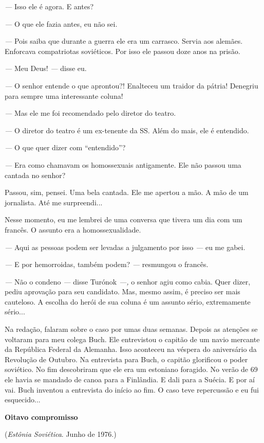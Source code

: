 \emph{---} Isso ele é agora. E antes?

\emph{---} O que ele fazia antes, eu não sei.

\emph{---} Pois saiba que durante a guerra ele era um carrasco. Servia
aos alemães. Enforcava compatriotas soviéticos. Por isso ele passou doze
anos na prisão.

\emph{---} Meu Deus! \emph{---} disse eu.

\emph{---} O senhor entende o que aprontou?! Enalteceu um traidor da
pátria! Denegriu para sempre uma interessante coluna!

\emph{---} Mas ele me foi recomendado pelo diretor do teatro.

\emph{---} O diretor do teatro é um ex-tenente da SS. Além do mais, ele
é entendido.

\emph{---} O que quer dizer com ``entendido''?

\emph{---} Era como chamavam os homossexuais antigamente. Ele não passou
uma cantada no senhor?

Passou, sim, pensei. Uma bela cantada. Ele me apertou a mão. A mão de um
jornalista. Até me surpreendi...

Nesse momento, eu me lembrei de uma conversa que tivera um dia com um
francês. O assunto era a homossexualidade.

\emph{---} Aqui as pessoas podem ser levadas a julgamento por isso
\emph{---} eu me gabei.

\emph{---} E por hemorroidas, também podem? \emph{---} resmungou o
francês.

\emph{---} Não o condeno \emph{---} disse Turónok \emph{---,} o senhor
agiu como cabia. Quer dizer, pediu aprovação para seu candidato. Mas,
mesmo assim, é preciso ser mais cauteloso. A escolha do herói de sua
coluna é um assunto sério, extremamente sério...

Na redação, falaram sobre o caso por umas duas semanas. Depois as
atenções se voltaram para meu colega Buch. Ele entrevistou o capitão de
um navio mercante da República Federal da Alemanha. Isso aconteceu na
véspera do aniversário da Revolução de Outubro. Na entrevista para Buch,
o capitão glorificou o poder soviético. No fim descobriram que ele era
um estoniano foragido. No verão de 69 ele havia se mandado de canoa para
a Finlândia. E dali para a Suécia. E por aí vai. Buch inventou a
entrevista do início ao fim. O caso teve repercussão e eu fui
esquecido...

\textbf{Oitavo compromisso}

(\emph{Estônia Soviética}. Junho de 1976.)

